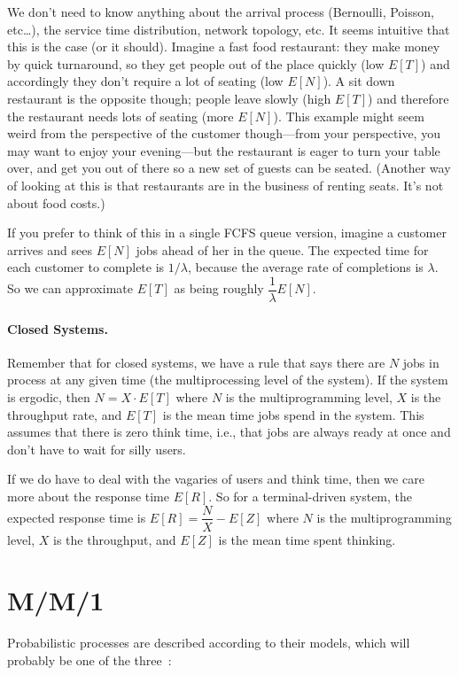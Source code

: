 \documentclass[a4paper]{report}
\begin{document}
We don't need to know anything about the arrival process (Bernoulli, Poisson, etc\ldots), the service time distribution, network topology, etc. It seems intuitive that this is the case (or it should). Imagine a fast food restaurant: they make money by quick turnaround, so they get people out of the place quickly (low $E[T]$) and accordingly they don't require a lot of seating (low $E[N]$). A sit down restaurant is the opposite though; people leave slowly (high $E[T]$) and therefore the restaurant needs lots of seating (more $E[N]$). This example might seem weird from the perspective of the customer though---from your perspective, you may want to enjoy your evening---but the restaurant is eager to turn your table over, and get you out of there so a new set of guests can be seated. (Another way of looking at this is that restaurants are in the business of renting seats. It's not about food costs.)

If you prefer to think of this in a single FCFS queue version, imagine a customer arrives and sees $E[N]$ jobs ahead of her in the queue. The expected time for each customer to complete is $1/\lambda$, because the average rate of completions is $\lambda $. So we can approximate $E[T]$ as being roughly $\dfrac{1}{\lambda}E[N]$.

\paragraph{Closed Systems.} Remember that for closed systems, we have a rule that says there are $N$ jobs in process at any given time (the multiprocessing level of the system). If the system is ergodic, then $N = X \cdot E[T]$ where $N$ is the multiprogramming level, $X$ is the throughput rate, and $E[T]$ is the mean time jobs spend in the system. This assumes that there is zero think time, i.e., that jobs are always ready at once and don't have to wait for silly users.

If we do have to deal with the vagaries of users and think time, then we care more about the response time $E[R]$. So for a terminal-driven system, the expected response time is $E[R] = \dfrac{N}{X} - E[Z]$ where $N$ is the multiprogramming level, $X$ is the throughput, and $E[Z]$ is the mean time spent thinking. 

\section*{M/M/1}

Probabilistic processes are described according to their models, which will probably be one of the three~\cite{swps}:
\end{document}
